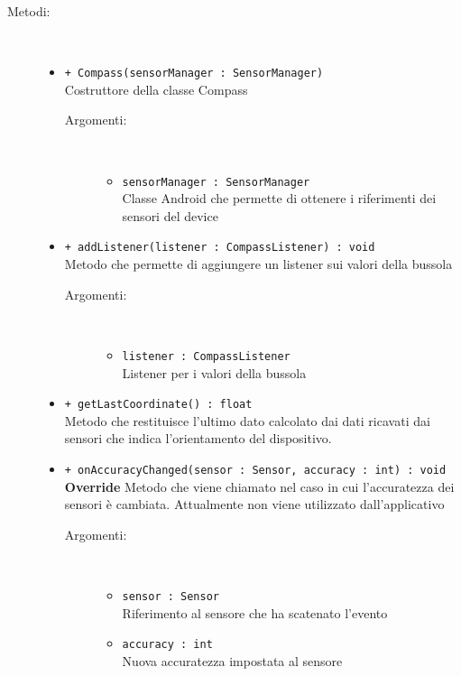 \documentclass[../DefinizioneDiProdotto.tex]{subfiles}
\begin{document}
\begin{description}
\begin{itemize}
	\end{itemize}
	\item[Metodi:] \
	\begin{itemize}
		\item \texttt{+ Compass(sensorManager : SensorManager)}\\
		Costruttore della classe Compass
		\begin{description}
			\item[Argomenti:] \
			\begin{itemize}
				\item \texttt{sensorManager : SensorManager}\\
				Classe Android che permette di ottenere i riferimenti dei sensori del device\end{itemize}
		\end{description}
		\item \texttt{+ addListener(listener : CompassListener) : void}\\
		Metodo che permette di aggiungere un listener sui valori della bussola
		\begin{description}
			\item[Argomenti:] \
			\begin{itemize}
				\item \texttt{listener : CompassListener}\\
				Listener per i valori della bussola\end{itemize}
		\end{description}
		\item \texttt{+ getLastCoordinate() : float}\\
		Metodo che restituisce l'ultimo dato calcolato dai dati ricavati dai sensori che indica l'orientamento del dispositivo.
		\item \texttt{+ onAccuracyChanged(sensor : Sensor, accuracy : int) : void}\\
		\textbf{Override} Metodo che viene chiamato nel caso in cui l'accuratezza dei sensori è cambiata. Attualmente non viene utilizzato dall'applicativo
		\begin{description}
			\item[Argomenti:] \
			\begin{itemize}
				\item \texttt{sensor : Sensor}\\
				Riferimento al sensore che ha scatenato l'evento\item \texttt{accuracy : int}\\
				Nuova accuratezza impostata al sensore \end{itemize}

\end{description}
\end{itemize}
\end{description}
\end{document}
